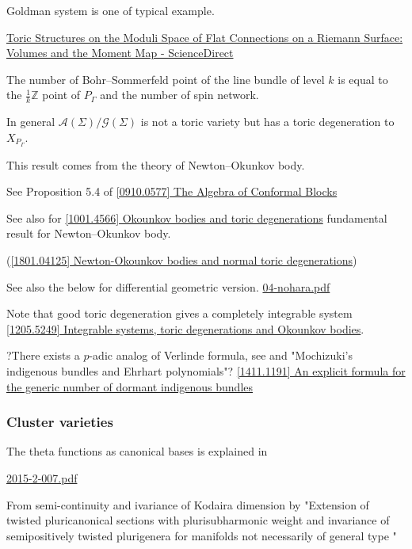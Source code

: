 \documentclass[a4paper,dvipdfmx,reqno,12pt]{amsart}
\theoremstyle{definition}
\newcommand{\Z}{\mathbb{Z}}%
\newcommand{\mcal}[1]{\mathcal{#1}}%
\numberwithin{equation}{section}
\begin{document}
Goldman system is one of typical example.

\href{https://www.sciencedirect.com/science/article/pii/S0001870884710541}{Toric Structures on the Moduli Space of Flat Connections on a Riemann Surface: Volumes and the Moment Map - ScienceDirect}

The number of Bohr--Sommerfeld point of the line bundle of level $k$ is 
equal to the $\frac{1}{k}\Z$ point of $P_{\Gamma}$ and the number of 
spin network.

In general $\mcal{A}(\Sigma)/\mcal{G}(\Sigma)$ is not a 
toric variety but has a toric degeneration to $X_{P_{\Gamma}}$.

This result comes from the theory of Newton--Okunkov body.

See Proposition 5.4 of \href{https://arxiv.org/abs/0910.0577}{[0910.0577] The Algebra of Conformal Blocks}

See also for \href{https://arxiv.org/abs/1001.4566}{[1001.4566] Okounkov bodies and toric degenerations}
 fundamental result for Newton--Okunkov body.

(\href{https://arxiv.org/abs/1801.04125}{[1801.04125] Newton-Okounkov bodies and normal toric degenerations})

See also the below for differential geometric version.
\href{http://www.official.kotaroy.com/meeting/symposium/abstract.bak/04-nohara.pdf}{04-nohara.pdf}

Note that good toric degeneration gives a completely 
integrable system \href{https://arxiv.org/abs/1205.5249}{[1205.5249] Integrable systems, toric degenerations and Okounkov bodies}.

?There exists a $p$-adic analog of Verlinde formula, see 
\cite[]{} and "Mochizuki’s indigenous bundles and Ehrhart polynomials"?
\href{https://arxiv.org/abs/1411.1191}{[1411.1191] An explicit formula for the generic number of dormant indigenous bundles}


\subsubsection{Cluster varieties}



The theta functions as canonical bases is explained in 

\href{http://content.algebraicgeometry.nl/2015-2/2015-2-007.pdf}{2015-2-007.pdf}

From semi-continuity and ivariance of Kodaira dimension 
by "Extension of twisted pluricanonical sections
with plurisubharmonic weight and invariance of
semipositively twisted plurigenera for manifolds
not necessarily of general type
"
\end{document}
